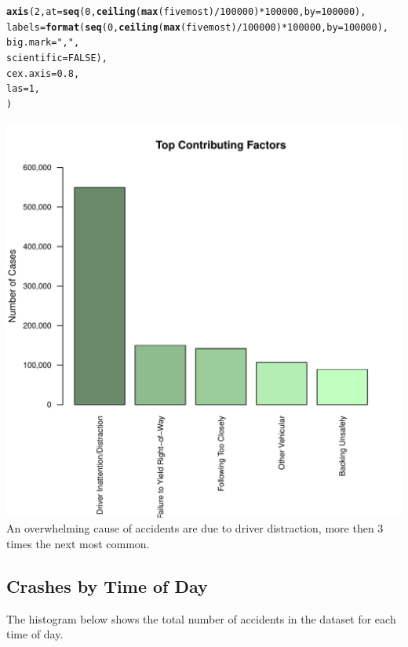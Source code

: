 \documentclass[10pt]{article}\usepackage[]{graphicx}\usepackage[]{xcolor}
\makeatletter
\def\maxwidth{ %
  \ifdim\Gin@nat@width>\linewidth
    \linewidth
  \else
    \Gin@nat@width
  \fi
}
\newcommand{\hlnum}[1]{\textcolor[rgb]{0.686,0.059,0.569}{#1}}%
\newcommand{\hlsng}[1]{\textcolor[rgb]{0.192,0.494,0.8}{#1}}%
\newcommand{\hlopt}[1]{\textcolor[rgb]{0,0,0}{#1}}%
\newcommand{\hldef}[1]{\textcolor[rgb]{0.345,0.345,0.345}{#1}}%
\newcommand{\hlkwc}[1]{\textcolor[rgb]{0.333,0.667,0.333}{#1}}%
\newcommand{\hlkwd}[1]{\textcolor[rgb]{0.737,0.353,0.396}{\textbf{#1}}}%
\newenvironment{kframe}{%
 \def\at@end@of@kframe{}%
 \ifinner\ifhmode%
  \def\at@end@of@kframe{\end{minipage}}%
  \begin{minipage}{\columnwidth}%
 \fi\fi%
 \def\FrameCommand##1{\hskip\@totalleftmargin \hskip-\fboxsep
 \colorbox{shadecolor}{##1}\hskip-\fboxsep
     \hskip-\linewidth \hskip-\@totalleftmargin \hskip\columnwidth}%
 \MakeFramed {\advance\hsize-\width
   \@totalleftmargin\z@ \linewidth\hsize
   \@setminipage}}%
 {\par\unskip\endMakeFramed%
 \at@end@of@kframe}
\newenvironment{knitrout}{}{} %
\makeatother
\begin{document}
\begin{knitrout}
\begin{kframe}
\begin{alltt}
\hlkwd{axis}\hldef{(}\hlnum{2}\hldef{,} \hlkwc{at} \hldef{=} \hlkwd{seq}\hldef{(}\hlnum{0}\hldef{,} \hlkwd{ceiling}\hldef{(}\hlkwd{max}\hldef{(fivemost)}\hlopt{/}\hlnum{100000}\hldef{)}\hlopt{*}\hlnum{100000}\hldef{,} \hlkwc{by} \hldef{=} \hlnum{100000}\hldef{),}
     \hlkwc{labels} \hldef{=} \hlkwd{format}\hldef{(}\hlkwd{seq}\hldef{(}\hlnum{0}\hldef{,} \hlkwd{ceiling}\hldef{(}\hlkwd{max}\hldef{(fivemost)}\hlopt{/}\hlnum{100000}\hldef{)}\hlopt{*}\hlnum{100000}\hldef{,} \hlkwc{by} \hldef{=} \hlnum{100000}\hldef{),}
                     \hlkwc{big.mark} \hldef{=} \hlsng{","}\hldef{,}
                     \hlkwc{scientific} \hldef{=} \hlnum{FALSE}\hldef{),}
     \hlkwc{cex.axis} \hldef{=} \hlnum{0.8}\hldef{,}
     \hlkwc{las} \hldef{=} \hlnum{1}\hldef{,}
     \hldef{)}
\end{alltt}
\end{kframe}
\includegraphics[width=\maxwidth]{figure/unnamed-chunk-4-1} 
\end{knitrout}
An overwhelming cause of accidents are due to driver distraction, more then 3 times the next most common.


\subsection{Crashes by Time of Day}

The histogram below shows the total number of accidents in the dataset for each time of day. 
\end{document}
